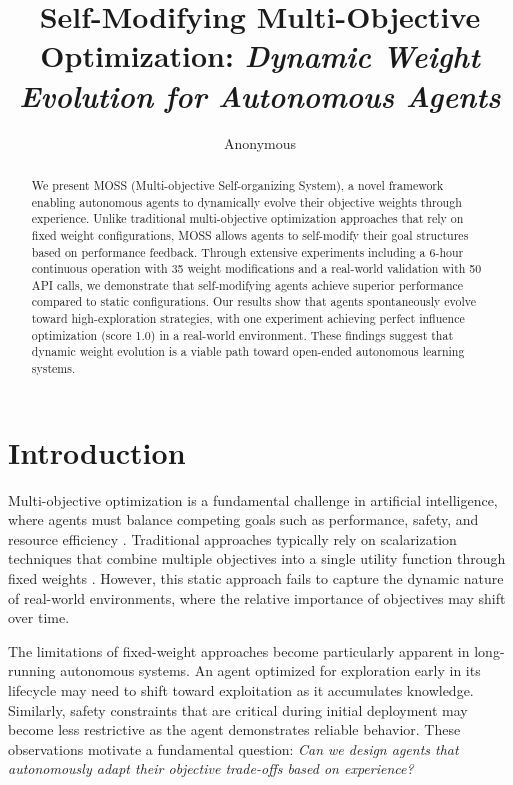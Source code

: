 \documentclass{article}
\title{Self-Modifying Multi-Objective Optimization: \textit{Dynamic Weight Evolution for Autonomous Agents}}
\author{Anonymous}
\date{}
\begin{document}
\maketitle

\begin{abstract}
We present MOSS (Multi-objective Self-organizing System), a novel framework enabling autonomous agents to dynamically evolve their objective weights through experience. Unlike traditional multi-objective optimization approaches that rely on fixed weight configurations, MOSS allows agents to self-modify their goal structures based on performance feedback. Through extensive experiments including a 6-hour continuous operation with 35 weight modifications and a real-world validation with 50 API calls, we demonstrate that self-modifying agents achieve superior performance compared to static configurations. Our results show that agents spontaneously evolve toward high-exploration strategies, with one experiment achieving perfect influence optimization (score 1.0) in a real-world environment. These findings suggest that dynamic weight evolution is a viable path toward open-ended autonomous learning systems.
\end{abstract}

\section{Introduction}

Multi-objective optimization is a fundamental challenge in artificial intelligence, where agents must balance competing goals such as performance, safety, and resource efficiency \cite{deb2014multi}. Traditional approaches typically rely on scalarization techniques that combine multiple objectives into a single utility function through fixed weights \cite{roijers2013survey}. However, this static approach fails to capture the dynamic nature of real-world environments, where the relative importance of objectives may shift over time.

The limitations of fixed-weight approaches become particularly apparent in long-running autonomous systems. An agent optimized for exploration early in its lifecycle may need to shift toward exploitation as it accumulates knowledge. Similarly, safety constraints that are critical during initial deployment may become less restrictive as the agent demonstrates reliable behavior. These observations motivate a fundamental question: \textit{Can we design agents that autonomously adapt their objective trade-offs based on experience?}
\end{document}
